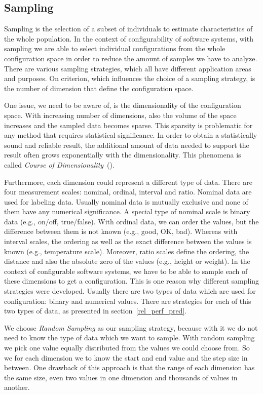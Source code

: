 \subsection{Sampling}
\label{perf_measure_sampling}

Sampling is the selection of a subset of individuals to estimate characteristics of the whole population. In the context of configurability of software systems, with sampling we are able to select individual configurations from the whole configuration space in order to reduce the amount of samples we have to analyze. There are various sampling strategies, which all have different application areas and purposes. On criterion, which influences the choice of a sampling strategy, is the number of dimension that define the configuration space. 

One issue, we need to be aware of, is the dimensionality of the configuration space. With increasing number of dimensions, also the volume of the space increases and the sampled data becomes sparse. This sparsity is problematic for any method that requires statistical significance. In order to obtain a statistically sound and reliable result, the additional amount of data needed to support the result often grows exponentially with the dimensionality. This phenomena is called \textit{Course of Dimensionality}~(\cite{donoho2000high}).

Furthermore, each dimension could represent a different type of data. There are four measurement scales: nominal, ordinal, interval and ratio. Nominal data are used for labeling data. Usually nominal data is mutually exclusive and none of them have any numerical significance. A special type of nominal scale is binary data (e.g., on/off, true/false). With ordinal data, we can order the values, but the difference between them is not known (e.g., good, OK, bad). Whereas with interval scales, the ordering as well as the exact difference between the values is known (e.g., temperature scale). Moreover, ratio scales define the ordering, the distance and also the absolute zero of the values (e.g., height or weight). In the context of configurable software systems, we have to be able to sample each of these dimensions to get a configuration. This is one reason why different sampling strategies were developed. Usually there are two types of data which are used for configuration: binary and numerical values. There are strategies for each of this two types of data, as presented in section~\ref{rel_perf_pred}.

We choose \textit{Random Sampling} as our sampling strategy, because with it we do not need to know the type of data which we want to sample. With random sampling we pick one value equally distributed from the values we could choose from. So we for each dimension we to know the start and end value and the step size in between. One drawback of this approach is that the range of each dimension has the same size, even two values in one dimension and thousands of values in another.


